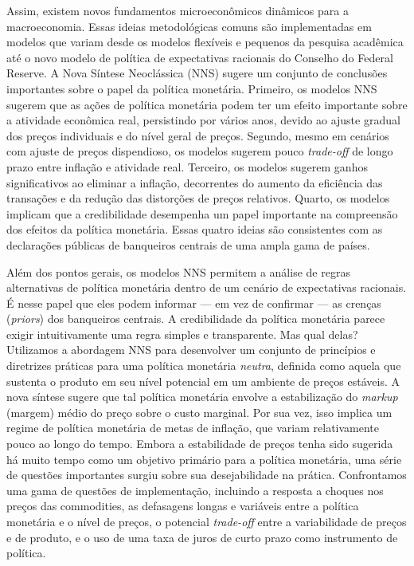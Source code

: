 \documentclass[12pt]{article}
\begin{document}
Assim, existem novos fundamentos microeconômicos dinâmicos para a macroeconomia. Essas ideias metodológicas comuns são implementadas em modelos que variam desde os modelos flexíveis e pequenos da pesquisa acadêmica até o novo modelo de política de expectativas racionais do Conselho do Federal Reserve. A Nova Síntese Neoclássica (NNS) sugere um conjunto de conclusões importantes sobre o papel da política monetária. Primeiro, os modelos NNS sugerem que as ações de política monetária podem ter um efeito importante sobre a atividade econômica real, persistindo por vários anos, devido ao ajuste gradual dos preços individuais e do nível geral de preços. Segundo, mesmo em cenários com ajuste de preços dispendioso, os modelos sugerem pouco \textit{trade-off} de longo prazo entre inflação e atividade real. Terceiro, os modelos sugerem ganhos significativos ao eliminar a inflação, decorrentes do aumento da eficiência das transações e da redução das distorções de preços relativos. Quarto, os modelos implicam que a credibilidade desempenha um papel importante na compreensão dos efeitos da política monetária. Essas quatro ideias são consistentes com as declarações públicas de banqueiros centrais de uma ampla gama de países.

Além dos pontos gerais, os modelos NNS permitem a análise de regras alternativas de política monetária dentro de um cenário de expectativas racionais. É nesse papel que eles podem informar — em vez de confirmar — as crenças (\textit{priors}) dos banqueiros centrais. A credibilidade da política monetária parece exigir intuitivamente uma regra simples e transparente. Mas qual delas? Utilizamos a abordagem NNS para desenvolver um conjunto de princípios e diretrizes práticas para uma política monetária \textit{neutra}, definida como aquela que sustenta o produto em seu nível potencial em um ambiente de preços estáveis. A nova síntese sugere que tal política monetária envolve a estabilização do \textit{markup} (margem) médio do preço sobre o custo marginal. Por sua vez, isso implica um regime de política monetária de metas de inflação, que variam relativamente pouco ao longo do tempo. Embora a estabilidade de preços tenha sido sugerida há muito tempo como um objetivo primário para a política monetária, uma série de questões importantes surgiu sobre sua desejabilidade na prática. Confrontamos uma gama de questões de implementação, incluindo a resposta a choques nos preços das commodities, as defasagens longas e variáveis entre a política monetária e o nível de preços, o potencial \textit{trade-off} entre a variabilidade de preços e de produto, e o uso de uma taxa de juros de curto prazo como instrumento de política.
\end{document}
